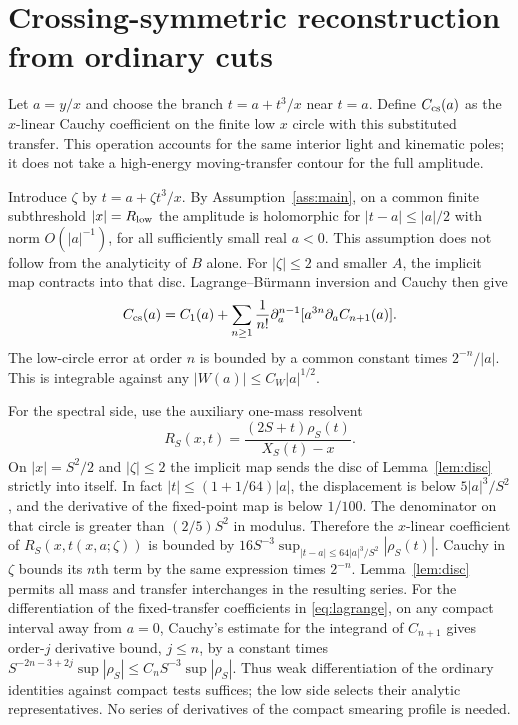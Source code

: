 \documentclass[11pt,a4paper]{article}
\theoremstyle{definition}
\theoremstyle{remark}
\begin{document}
\section{Crossing-symmetric reconstruction from ordinary cuts}\label{sec:reconstruction}
Let $a=y/x$ and choose the branch
$t=a+t^3/x$ near $t=a$. Define $C_{\rm cs}(a)$ as the $x$-linear Cauchy coefficient on the finite low $x$ circle with this substituted transfer. This operation accounts for the same interior light and kinematic poles; it does not take a high-energy moving-transfer contour for the full amplitude.

Introduce $\zeta$ by $t=a+\zeta t^3/x$. By Assumption~\ref{ass:main}, on a common finite subthreshold $|x|=R_{\rm low}$ the amplitude is holomorphic for $|t-a|\le |a|/2$ with norm $O(|a|^{-1})$, for all sufficiently small real $a<0$. This assumption does not follow from the analyticity of $B$ alone. For $|\zeta|\le2$ and smaller $A$, the implicit map contracts into that disc. Lagrange--B\"urmann inversion and Cauchy then give
\begin{equation}\label{eq:lagrange}
 C_{\rm cs}(a)=C_1(a)+
 \sum_{n\ge1}\frac1{n!}\partial_a^{n-1}
                       [a^{3n}\partial_a C_{n+1}(a)].
\end{equation}
The low-circle error at order $n$ is bounded by a common constant times $2^{-n}/|a|$. This is integrable against any $|W(a)|\le C_W|a|^{1/2}$.

For the spectral side, use the auxiliary one-mass resolvent
\begin{equation}\label{eq:resolvent}
 R_S(x,t)=\frac{(2S+t)\rho_S(t)}{X_S(t)-x}.
\end{equation}
On $|x|=S^2/2$ and $|\zeta|\le2$ the implicit map sends the disc of Lemma~\ref{lem:disc} strictly into itself. In fact $|t|\le(1+1/64)|a|$, the displacement is below $5|a|^3/S^2$, and the derivative of the fixed-point map is below $1/100$. The denominator on that circle is greater than $(2/5)S^2$ in modulus. Therefore the $x$-linear coefficient of $R_S(x,t(x,a;\zeta))$ is bounded by
$16S^{-3}\sup_{|t-a|\le64|a|^3/S^2}|\rho_S(t)|$.
Cauchy in $\zeta$ bounds its $n$th term by the same expression times $2^{-n}$. Lemma~\ref{lem:disc} permits all mass and transfer interchanges in the resulting series. For the differentiation of the fixed-transfer coefficients in \eqref{eq:lagrange}, on any compact interval away from $a=0$, Cauchy's estimate for the integrand of $C_{n+1}$ gives order-$j$ derivative bound, $j\le n$, by a constant times
$S^{-2n-3+2j}\sup |\rho_S|\le C_n S^{-3}\sup |\rho_S|$.
Thus weak differentiation of the ordinary identities against compact tests suffices; the low side selects their analytic representatives. No series of derivatives of the compact smearing profile is needed.
\end{document}
